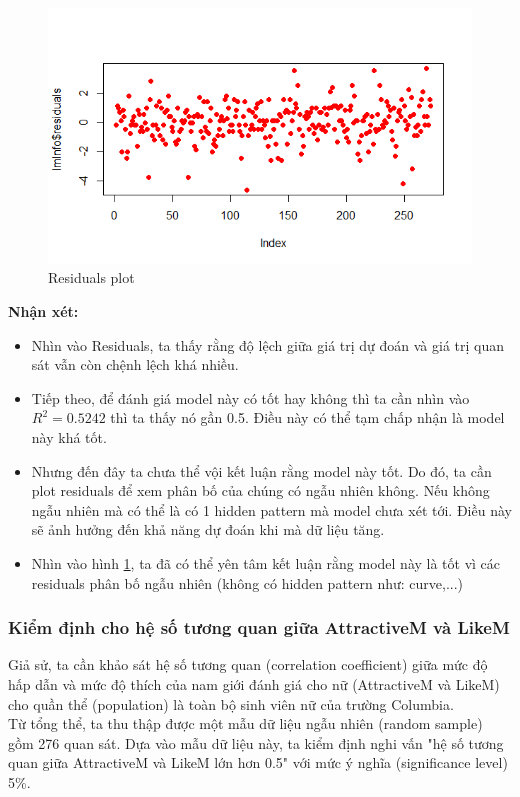 \documentclass[a4paper,12pt]{article}
\begin{document}
	\begin{figure}[H]
		\centering
		\includegraphics[width=0.7\linewidth]{Rplot7}
		\caption{Residuals plot}
		\label{fig:rplot7}
	\end{figure}
	
	\textbf{Nhận xét:}
	\begin{itemize}
		\item Nhìn vào Residuals, ta thấy rằng độ lệch giữa giá trị dự đoán và giá trị quan sát vẫn còn chệnh lệch khá nhiều.
		\item Tiếp theo, để đánh giá model này có tốt hay không thì ta cần nhìn vào $R^2 = 0.5242$ thì ta thấy nó gần 0.5. Điều này có thể tạm chấp nhận là model này khá tốt.
		\item Nhưng đến đây ta chưa thể vội kết luận rằng model này tốt. Do đó, ta cần plot residuals để xem phân bố của chúng có ngẫu nhiên không. Nếu không ngẫu nhiên mà có thể là có 1 hidden pattern mà model chưa xét tới. Điều này sẽ ảnh hưởng đến khả năng dự đoán khi mà dữ liệu tăng.
		\item Nhìn vào hình \ref{fig:rplot7}, ta đã có thể yên tâm kết luận rằng model này là tốt vì các residuals phân bố ngẫu nhiên (không có hidden pattern như: curve,...)
	\end{itemize}
	
	\subsubsection{Kiểm định cho hệ số tương quan giữa AttractiveM và LikeM}
	Giả sử, ta cần khảo sát hệ số tương quan (correlation coefficient) giữa mức độ hấp dẫn và mức độ thích của nam giới đánh giá cho nữ (AttractiveM và LikeM) cho quần thể (population) là toàn bộ sinh viên nữ của trường Columbia.\\
	
	Từ tổng thể, ta thu thập được một mẫu dữ liệu ngẫu nhiên (random sample) gồm 276 quan sát. Dựa vào mẫu dữ liệu này, ta kiểm định nghi vấn "hệ số tương quan giữa AttractiveM và LikeM lớn hơn 0.5" với mức ý nghĩa (significance level) 5\%.\\
	
\end{document}

